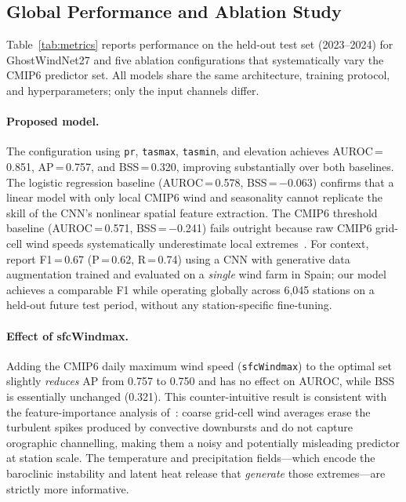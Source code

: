 \documentclass{article}
\begin{document}
\subsection{Global Performance and Ablation Study}
\label{sec:ablation}

Table~\ref{tab:metrics} reports performance on the held-out test set (2023--2024) for GhostWindNet27 and five ablation configurations that systematically vary the CMIP6 predictor set. All models share the same architecture, training protocol, and hyperparameters; only the input channels differ.

\paragraph{Proposed model.}
The configuration using \texttt{pr}, \texttt{tasmax}, \texttt{tasmin}, and elevation achieves AUROC\,=\,0.851, AP\,=\,0.757, and BSS\,=\,0.320, improving substantially over both baselines. The logistic regression baseline (AUROC\,=\,0.578, BSS\,=\,$-$0.063) confirms that a linear model with only local CMIP6 wind and seasonality cannot replicate the skill of the CNN's nonlinear spatial feature extraction. The CMIP6 threshold baseline (AUROC\,=\,0.571, BSS\,=\,$-$0.241) fails outright because raw CMIP6 grid-cell wind speeds systematically underestimate local extremes~\cite{shenCMIP6Wind2022}. For context, \citet{VegaBayo2024} report F1\,=\,0.67 (P\,=\,0.62, R\,=\,0.74) using a CNN with generative data augmentation trained and evaluated on a \emph{single} wind farm in Spain; our model achieves a comparable F1 while operating globally across 6{,}045 stations on a held-out future test period, without any station-specific fine-tuning.

\paragraph{Effect of sfcWindmax.}
Adding the CMIP6 daily maximum wind speed (\texttt{sfcWindmax}) to the optimal set slightly \emph{reduces} AP from 0.757 to 0.750 and has no effect on AUROC, while BSS is essentially unchanged (0.321). This counter-intuitive result is consistent with the feature-importance analysis of~\cite{flora2025thunderstorm}: coarse grid-cell wind averages erase the turbulent spikes produced by convective downbursts and do not capture orographic channelling, making them a noisy and potentially misleading predictor at station scale. The temperature and precipitation fields---which encode the baroclinic instability and latent heat release that \emph{generate} those extremes---are strictly more informative.
\end{document}
